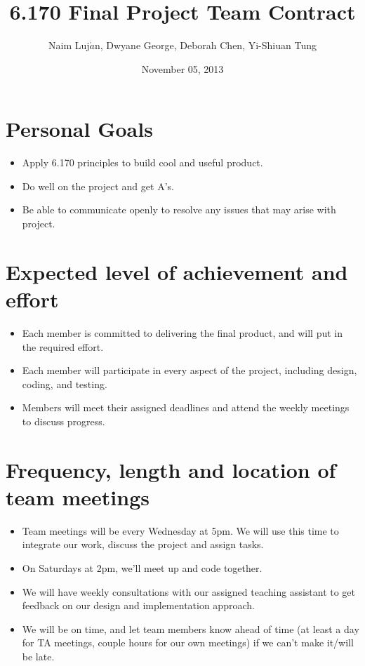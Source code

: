 \documentclass{article}
\title{6.170 Final Project Team Contract}
\date{November 05, 2013}
\author{Naim Luj$\acute{a}$n, Dwyane George, Deborah Chen, Yi-Shiuan Tung}
\begin{document}
\maketitle{}

\section*{Personal Goals}
\begin{itemize}
\item Apply 6.170 principles to build cool and useful product.
\item Do well on the project and get A's.
\item Be able to communicate openly to resolve any issues that may arise with project.
\end{itemize}

\section*{Expected level of achievement and effort}
\begin{itemize}
\item Each member is committed to delivering the final product, and will put in the required effort.
\item Each member will participate in every aspect of the project, including design, coding, and testing.
\item Members will meet their assigned deadlines and attend the weekly meetings to discuss progress.
\end{itemize}

\section*{Frequency, length and location of team meetings}
\begin{itemize}
\item Team meetings will be every Wednesday at 5pm. We will use this time to integrate our work, discuss the project and assign tasks.
\item On Saturdays at 2pm, we'll meet up and code together.
\item We will have weekly consultations with our assigned teaching assistant to get feedback on our design and implementation approach.
\item We will be on time, and let team members know ahead of time (at least a day for TA meetings, couple hours for our own meetings) if we can’t make it/will be late. 
\end{itemize}
\end{document}
